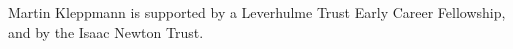\documentclass[manuscript]{acmart}
\begin{document}







\begin{acks}
Martin Kleppmann is supported by a Leverhulme Trust Early Career Fellowship, and by the Isaac Newton Trust.
\end{acks}



\end{document}
